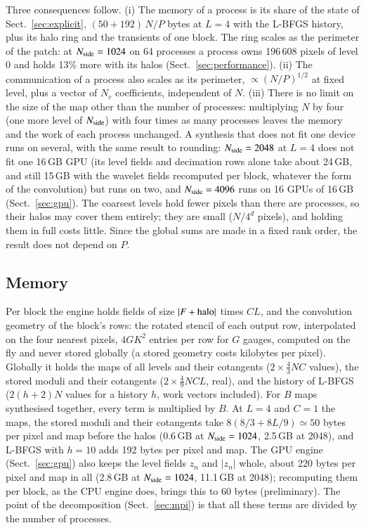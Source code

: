 \documentclass{aa}
\newcommand{\nside}{N_{\rm side}}
\begin{document}
Three consequences follow. (i) The memory of a process is its share of the state of Sect.~\ref{sec:explicit}, $(50 + 192)\,N/P$ bytes at $L=4$ with the L-BFGS history, plus its halo ring and the transients of one block. The ring scales as the perimeter of the patch: at $\nside=1024$ on 64 processes a process owns 196\,608 pixels of level 0 and holds 13\% more with its halos (Sect.~\ref{sec:performance}). (ii) The communication of a process also scales as its perimeter, $\propto(N/P)^{1/2}$ at fixed level, plus a vector of $N_c$ coefficients, independent of $N$. (iii) There is no limit on the size of the map other than the number of processes: multiplying $N$ by four (one more level of $\nside$) with four times as many processes leaves the memory and the work of each process unchanged. A synthesis that does not fit one device runs on several, with the same result to rounding: $\nside=2048$ at $L=4$ does not fit one 16\,GB GPU (its level fields and decimation rows alone take about 24\,GB, and still 15\,GB with the wavelet fields recomputed per block, whatever the form of the convolution) but runs on two, and $\nside=4096$ runs on 16 GPUs of 16\,GB (Sect.~\ref{sec:gpu}). The coarsest levels hold fewer pixels than there are processes, so their halos may cover them entirely; they are small ($N/4^d$ pixels), and holding them in full costs little. Since the global sums are made in a fixed rank order, the result does not depend on $P$.

\subsection{Memory}
\label{sec:memory}

Per block the engine holds fields of size $|F + {\rm halo}|$ times $C L$, and the convolution geometry of the block's rows: the rotated stencil of each output row, interpolated on the four nearest pixels, $4GK^2$ entries per row for $G$ gauges, computed on the fly and never stored globally (a stored geometry costs kilobytes per pixel). Globally it holds the maps of all levels and their cotangents ($2\times\frac{4}{3}NC$ values), the stored moduli and their cotangents ($2\times\frac{4}{9}NCL$, real), and the history of L-BFGS ($2(h+2)N$ values for a history $h$, work vectors included). For $B$ maps synthesised together, every term is multiplied by $B$. At $L=4$ and $C=1$ the maps, the stored moduli and their cotangents take $8(8/3+8L/9)\simeq50$ bytes per pixel and map before the halos (0.6\,GB at $\nside=1024$, 2.5\,GB at 2048), and L-BFGS with $h=10$ adds 192 bytes per pixel and map. The GPU engine (Sect.~\ref{sec:gpu}) also keeps the level fields $z_n$ and $|z_n|$ whole, about 220 bytes per pixel and map in all (2.8\,GB at $\nside=1024$, 11.1\,GB at 2048); recomputing them per block, as the CPU engine does, brings this to 60 bytes (preliminary). The point of the decomposition (Sect.~\ref{sec:mpi}) is that all these terms are divided by the number of processes.
\end{document}
